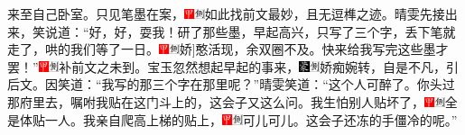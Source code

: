 来至自己卧室。只见笔墨在案，{\includegraphics[width=3mm]{../Images/00002}\includegraphics[width=3mm]{../Images/00011}\footnotesize \kaishu 如此找前文最妙，且无逗榫之迹。}晴雯先接出来，笑说道：``好，好，耍我！研了那些墨，早起高兴，只写了三个字，丢下笔就走了，哄的我们等了一日。{\includegraphics[width=3mm]{../Images/00002}\includegraphics[width=3mm]{../Images/00011}\footnotesize \kaishu {[}娇{]}憨活现，余双圈不及。}快来给我写完这些墨才罢！''{\includegraphics[width=3mm]{../Images/00002}\includegraphics[width=3mm]{../Images/00011}\footnotesize \kaishu 补前文之未到。}宝玉忽然想起早起的事来，{\includegraphics[width=3mm]{../Images/00006}\includegraphics[width=3mm]{../Images/00011}\footnotesize \kaishu 娇痴婉转，自是不凡，引后文。}因笑道：``我写的那三个字在那里呢？''晴雯笑道：``这个人可醉了。你头过那府里去，嘱咐我贴在这门斗上的，这会子又这么问。我生怕别人贴坏了，{\includegraphics[width=3mm]{../Images/00002}\includegraphics[width=3mm]{../Images/00011}\footnotesize \kaishu 全是体贴一人。}我亲自爬高上梯的贴上，{\includegraphics[width=3mm]{../Images/00002}\includegraphics[width=3mm]{../Images/00011}\footnotesize \kaishu 可儿可儿。}这会子还冻的手僵冷的呢。''{
}
